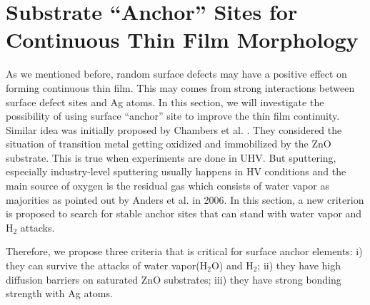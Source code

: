 \section{Substrate ``Anchor'' Sites for Continuous Thin Film Morphology}
\label{Chap:Ag/ZnO:section:anchor}

As we mentioned before, random surface defects may have a positive effect on forming continuous thin film. This may comes from strong interactions between surface defect sites and Ag atoms. In this section, we will investigate the possibility of using surface ``anchor'' site to improve the thin film continuity. Similar idea was initially proposed by Chambers et al. \cite{chambers2002laminar}. They considered the situation of transition metal getting oxidized and immobilized by the ZnO substrate. This is true when experiments are done in \ac{UHV}. But sputtering, especially industry-level sputtering usually happens in \ac{HV} conditions and the main source of oxygen is the residual gas which consists of water vapor as majorities as pointed out by Anders et al. \cite{anders2006smoothing} in 2006. In this section, a new criterion is proposed to search for stable anchor sites that can stand with water vapor and $\text{H}_{\text{2}}$ attacks. 

Therefore, we propose three criteria that is critical for surface anchor elements: i) they can survive the attacks of water vapor($\text{H}_{\text{2}}\text{O}$) and $\text{H}_{\text{2}}$; ii) they have high diffusion barriers on saturated ZnO substrates; iii) they have strong bonding strength with Ag atoms.

